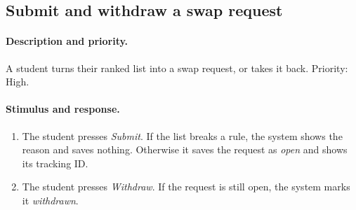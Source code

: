 \documentclass[11pt,a4paper,parskip=half,toc=listof]{scrreprt}
\begin{document}
\subsection{Submit and withdraw a swap request}

\paragraph{Description and priority.} A student turns their ranked list
into a swap request, or takes it back. Priority: High.

\paragraph{Stimulus and response.}
\begin{enumerate}
  \item The student presses \emph{Submit}. If the list breaks a rule, the
    system shows the reason and saves nothing. Otherwise it saves the
    request as \emph{open} and shows its tracking ID.
  \item The student presses \emph{Withdraw}. If the request is still open,
    the system marks it \emph{withdrawn}.
\end{enumerate}
\end{document}
